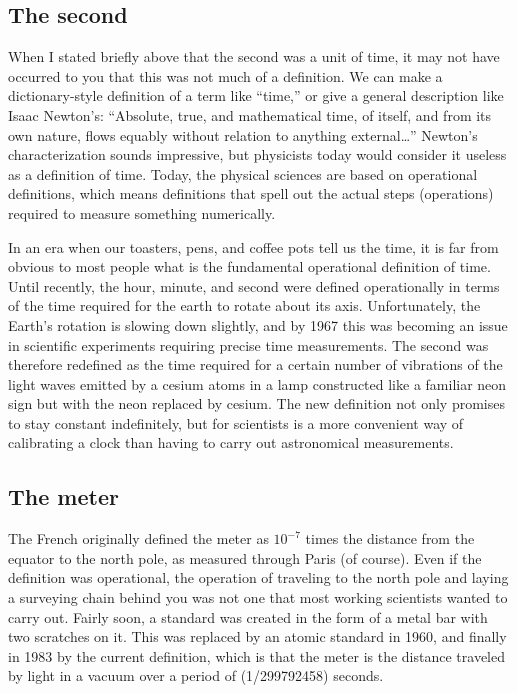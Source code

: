 \subsection{The second}


When I stated briefly above that the second was a unit of
time, it may not have occurred to you that this was not
much of a definition. We can make a dictionary-style
definition of a term like ``time,'' or give a general description
like Isaac Newton's: ``Absolute, true, and mathematical time, of itself, and from
its own nature, flows equably without relation to anything external\ldots''
Newton's characterization sounds impressive, but 
physicists today would consider it useless as a definition
of time. Today, the physical sciences are based on
\label{operational-definitions}operational definitions,
which means definitions that spell out the actual steps
(operations) required to measure something numerically.

In an era when our toasters, pens, and coffee pots tell
us the time, it is far from obvious to most people what is
the fundamental operational definition of time. Until
recently, the hour, minute, and second were defined
operationally in terms of the time required for the earth to
rotate about its axis. Unfortunately, the Earth's rotation
is slowing down slightly, and by 1967 this was becoming an
issue in scientific experiments requiring precise time
measurements. The second was therefore
redefined as the time required for a certain number of
vibrations of the light waves emitted by a cesium atoms in a
lamp constructed like a familiar neon sign but with the neon
replaced by cesium. The new definition not only promises to
stay constant indefinitely, but for scientists is a more
convenient way of calibrating a clock than having to carry
out astronomical measurements.




\subsection{The meter}


The French originally defined the meter as $10^{-7}$  times
the distance from the equator to the north pole, as measured
through Paris (of course). Even if the definition was
operational, the operation of traveling to the north pole
and laying a surveying chain behind you was not one that
most working scientists wanted to carry out. Fairly soon, a
standard was created in the form of a metal bar with two
scratches on it. This was replaced by an atomic standard in
1960, and finally in 1983 by the
current definition, which is that
the meter is the
distance traveled by light in a vacuum over a period of
(1/299792458) seconds.

